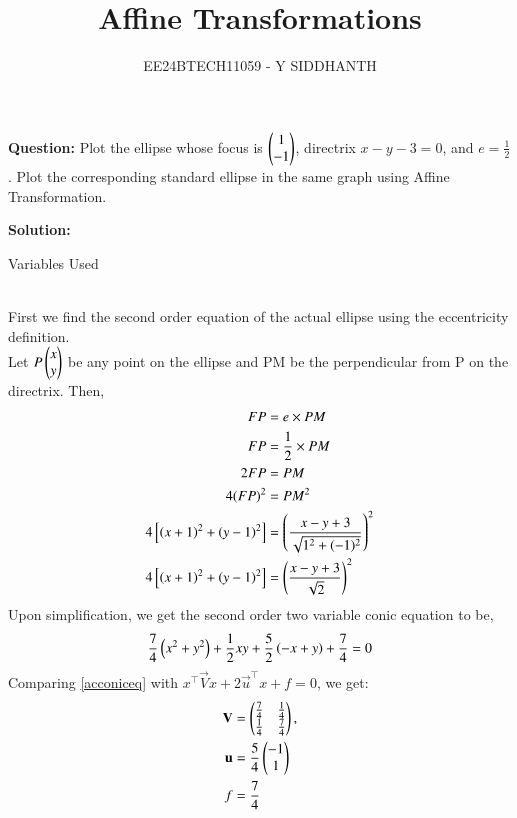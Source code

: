 \documentclass[journal]{IEEEtran}
\begin{document}
\onecolumn

\vspace{3cm}

\renewcommand{\thetable}{\theenumi}

\title{Affine Transformations}
\author{EE24BTECH11059 -  Y SIDDHANTH}
\maketitle

\renewcommand{\thetable}{\theenumi} 

\setcounter{section}{1}
\textbf{Question: } Plot the ellipse whose focus is $\begin{pmatrix}1 \\ -1\end{pmatrix}$, directrix $x-y-3 = 0$, and $e = \frac{1}{2}$. Plot the corresponding standard ellipse in the same graph using Affine Transformation.

\bigskip

\textbf{Solution: } 
\begin{table}[h!]    
	\centering
	
	\caption{Variables Used}
	\label{tab1-1.9-6}
\end{table}\\

First we find the second order equation of the actual ellipse using the eccentricity definition.\\
Let \(P\begin{pmatrix}x\\y\end{pmatrix}\) be any point on the ellipse and PM be the perpendicular from P on the directrix. Then,
\begin{align}
	FP &= e \times PM\\
	FP &= \frac{1}{2} \times PM\\
	2FP &= PM\\
	4(FP)^2 &= PM^2\\
	4{}\left[\left(x+1\right)^2 + \left(y-1\right)^2\right] &= \left(\frac{x - y + 3}{\sqrt{1^2 + (-1)^2}}\right)^2\\
	4{}\left[\left(x+1\right)^2 + \left(y-1\right)^2\right]  &= \left(\frac{x - y + 3}{\sqrt{2}}\right)^2
\end{align}
Upon simplification, we get the second order two variable conic equation to be,
\begin{align}
	\frac{7}{4}\left(x^2+y^2\right) + \frac{1}{2}xy + \frac{5}{2}\left(-x+y\right) + \frac{7}{4} = 0 \label{acconiceq}
\end{align}
Comparing \eqref{acconiceq} with $x^\top\vec{V}x + 2\vec{u}^\top x + f = 0$, we get:
\begin{align}
	\mathbf{V} &= \begin{pmatrix}\frac{7}{4} & \frac{1}{4} \\ \frac{1}{4} & \frac{7}{4}\end{pmatrix} ,
	\\
	\mathbf{u} &=\frac{5}{4}  \begin{pmatrix} -1 \\ 1\end{pmatrix}
	\\
	f &= \frac{7}{4}
\end{align}
\end{document}
